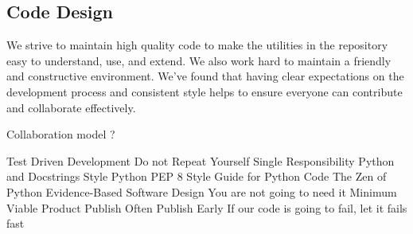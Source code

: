 \subsection{Code Design}

We strive to maintain high quality code to make the utilities in the repository easy to understand, use, and extend. We also work hard to maintain a friendly and constructive environment. We've found that having clear expectations on the development process and consistent style helps to ensure everyone can contribute and collaborate effectively.

Collaboration model ?

Test Driven Development
Do not Repeat Yourself
Single Responsibility
Python and Docstrings Style
Python PEP 8 Style Guide for Python Code
The Zen of Python
Evidence-Based Software Design
You are not going to need it
Minimum Viable Product
Publish Often Publish Early
If our code is going to fail, let it fails fast

